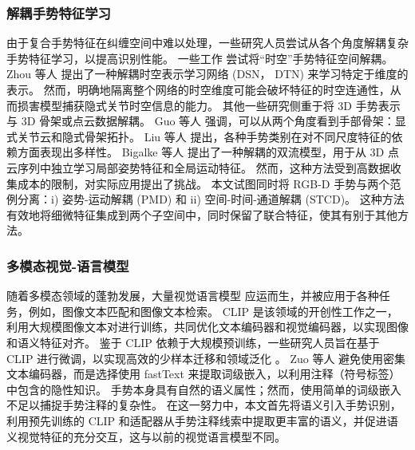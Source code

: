 
\subsubsection{解耦手势特征学习}
由于复合手势特征在纠缠空间\cite{zhou2023unified,LI2024110536}中难以处理，一些研究人员尝试从各个角度解耦复杂手势特征学习，以提高识别性能。
一些工作\cite{zhou2022decoupling,LI2024110536} 尝试将“时空”手势特征空间解耦。
Zhou 等人 \cite{zhou2023unified} 提出了一种解耦时空表示学习网络 (DSN， DTN) 来学习特定于维度的表示。
然而，明确地隔离整个网络的时空维度可能会破坏特征的时空连通性，从而损害模型捕获隐式关节时空信息的能力。
其他一些研究侧重于将 3D 手势表示与 3D 骨架或点云数据解耦。
Guo 等人 \cite{GUO2021108044} 强调，可以从两个角度看到手部骨架：显式关节云和隐式骨架拓扑。
Liu 等人\cite{liu2020decoupled} 提出，各种手势类别在对不同尺度特征的依赖方面表现出多样性。
Bigalke 等人 \cite{bigalke2021fusing} 提出了一种解耦的双流模型，用于从 3D 点云序列中独立学习局部姿势特征和全局运动特征。
然而，这种方法受到高数据收集成本的限制，对实际应用提出了挑战。
本文试图同时将 RGB-D 手势与两个范例分离：i) 姿势-运动解耦 (PMD) 和 ii) 空间-时间-通道解耦 (STCD)。
这种方法有效地将细微特征集成到两个子空间中，同时保留了联合特征，使其有别于其他方法。

\subsubsection{多模态视觉-语言模型}
随着多模态领域的蓬勃发展，大量视觉语言模型 \cite{radford2021learning, li2022blip} 应运而生，并被应用于各种任务，例如，图像文本匹配和图像文本检索。
CLIP \cite{radford2021learning} 是该领域的开创性工作之一，利用大规模图像文本对进行训练，共同优化文本编码器和视觉编码器，以实现图像和语义特征对齐。
鉴于 CLIP 依赖于大规模预训练，一些研究人员旨在基于 CLIP 进行微调，以实现高效的少样本迁移和领域泛化 \cite{gao2024clip}。
Zuo 等人 \cite{zuo2023natural} 避免使用密集文本编码器，而是选择使用 fastText 来提取词级嵌入，以利用注释（符号标签）中包含的隐性知识。
手势本身具有自然的语义属性；然而，使用简单的词级嵌入不足以捕捉手势注释的复杂性。
在这一努力中，本文首先将语义引入手势识别，利用预先训练的 CLIP 和适配器从手势注释线索中提取更丰富的语义，并促进语义视觉特征的充分交互，这与以前的视觉语言模型不同。


